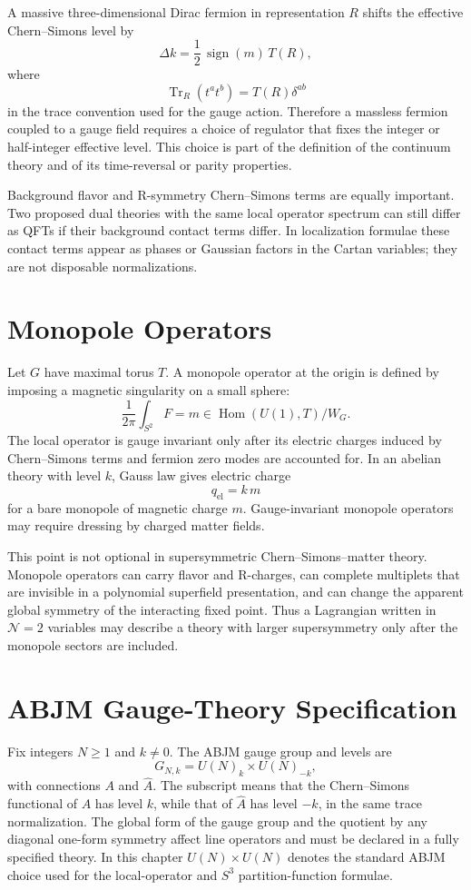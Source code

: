 A massive three-dimensional Dirac fermion in representation \(R\) shifts the
effective Chern--Simons level by
\[
  \Delta k=\frac12\,\operatorname{sign}(m)\,T(R),
\]
where
\[
  \operatorname{Tr}_R(t^at^b)=T(R)\delta^{ab}
\]
in the trace convention used for the gauge action.  Therefore a massless
fermion coupled to a gauge field requires a choice of regulator that fixes
the integer or half-integer effective level.  This choice is part of the
definition of the continuum theory and of its time-reversal or parity
properties.

Background flavor and R-symmetry Chern--Simons terms are equally important.
Two proposed dual theories with the same local operator spectrum can still
differ as QFTs if their background contact terms differ.  In localization
formulae these contact terms appear as phases or Gaussian factors in the
Cartan variables; they are not disposable normalizations.

\section{Monopole Operators}

Let \(G\) have maximal torus \(T\).  A monopole operator at the origin is
defined by imposing a magnetic singularity on a small sphere:
\[
  \frac1{2\pi}\int_{S^2}F=m\in\operatorname{Hom}(U(1),T)/W_G .
\]
The local operator is gauge invariant only after its electric charges induced
by Chern--Simons terms and fermion zero modes are accounted for.  In an
abelian theory with level \(k\), Gauss law gives electric charge
\[
  q_{\mathrm{el}}=k\,m
\]
for a bare monopole of magnetic charge \(m\).  Gauge-invariant monopole
operators may require dressing by charged matter fields.

This point is not optional in supersymmetric Chern--Simons--matter theory.
Monopole operators can carry flavor and R-charges, can complete multiplets
that are invisible in a polynomial superfield presentation, and can change
the apparent global symmetry of the interacting fixed point.  Thus a
Lagrangian written in \(\mathcal N=2\) variables may describe a theory with
larger supersymmetry only after the monopole sectors are included.

\section{ABJM Gauge-Theory Specification}
\label{sec:abjm-gauge-theory-specification}

Fix integers \(N\ge1\) and \(k\ne0\).  The ABJM gauge group and levels are
\[
  G_{N,k}=U(N)_k\times U(N)_{-k},
\]
with connections \(A\) and \(\widehat A\).  The subscript means that the
Chern--Simons functional of \(A\) has level \(k\), while that of
\(\widehat A\) has level \(-k\), in the same trace normalization.  The
global form of the gauge group and the quotient by any diagonal one-form
symmetry affect line operators and must be declared in a fully specified
theory.  In this chapter \(U(N)\times U(N)\) denotes the standard ABJM
choice used for the local-operator and \(S^3\) partition-function formulae.

